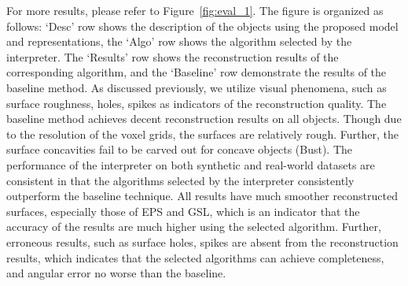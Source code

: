For more results, please refer to Figure~\ref{fig:eval_1}. The figure is organized as follows: `Desc' row shows the description of the objects using the proposed model and representations, the `Algo' row shows the algorithm selected by the interpreter. The `Results' row shows the reconstruction results of the corresponding algorithm, and the `Baseline' row demonstrate the results of the baseline method. As discussed previously, we utilize visual phenomena, such as surface roughness, holes, spikes as indicators of the reconstruction quality. The baseline method achieves decent reconstruction results on all objects. Though due to the resolution of the voxel grids, the surfaces are relatively rough. Further, the surface concavities fail to be carved out for concave objects (Bust). The performance of the interpreter on both synthetic and real-world datasets are consistent in that the algorithms selected by the interpreter consistently outperform the baseline technique. All results have much smoother reconstructed surfaces, especially those of EPS and GSL, which is an indicator that the accuracy of the results are much higher using the selected algorithm. Further, erroneous results, such as surface holes, spikes are absent from the reconstruction results, which indicates that the selected algorithms can achieve completeness, and angular error no worse than the baseline.

